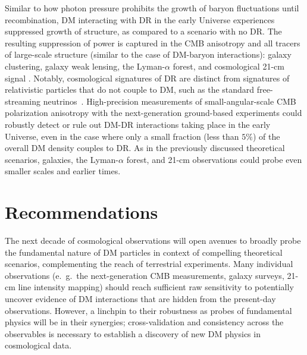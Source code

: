 \documentclass[12pt]{article}
\begin{document}
Similar to how photon pressure prohibits the growth of baryon fluctuations until recombination, DM interacting with DR in the early Universe experiences suppressed growth of structure, as compared to a scenario with no DR. 
The resulting suppression of power is captured in the CMB anisotropy and all tracers of large-scale structure (similar to the case of DM-baryon interactions): galaxy clustering, galaxy weak lensing, the Lyman-$\alpha$ forest, and cosmological 21-cm signal \cite{Boehm:2001hm,Cyr-Racine:2013fsa,Cyr-Racine:2015ihg}. 
Notably, cosmological signatures of DR are distinct from signatures of relativistic particles that do not couple to DM, such as the standard free-streaming neutrinos~\cite{Bashinsky:2003tk,Follin:2015hya,Baumann:2015rya}.
High-precision measurements of small-angular-scale CMB polarization anisotropy with the next-generation ground-based experiments could robustly detect or rule out DM-DR interactions taking place in the early Universe, even in the case where only a small fraction (less than $5\%$) of the overall DM density couples to DR. 
As in the previously discussed theoretical scenarios, galaxies, the Lyman-$\alpha$ forest, and 21-cm observations could probe even smaller scales and earlier times. 

\vspace{-0.4cm}
\section{Recommendations}
\label{sec:recommendations}
\vspace{-0.2cm}
The next decade of cosmological observations will open avenues to broadly probe the fundamental nature of DM particles in context of compelling theoretical scenarios, complementing the reach of terrestrial experiments.
Many individual observations (e.~g.~the next-generation CMB measurements, galaxy surveys, 21-cm line intensity mapping) should reach sufficient raw sensitivity to potentially uncover evidence of DM interactions that are hidden from the present-day observations.
However, a linchpin to their robustness as probes of fundamental physics will be in their synergies; cross-validation and consistency across the observables is necessary to establish a discovery of new DM physics in cosmological data.
\end{document}
